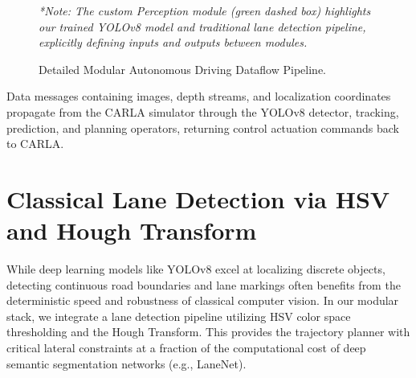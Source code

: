 \documentclass[11pt,a4paper]{report}
\begin{document}
\begin{figure}[htbp]
{
    }
    \vspace{1ex}
    
    {\small \textit{*Note: The custom Perception module (green dashed box) highlights our trained YOLOv8 model and traditional lane detection pipeline, explicitly defining inputs and outputs between modules.}}
    \caption{Detailed Modular Autonomous Driving Dataflow Pipeline.}
    \label{fig:pylot_diagram}
\end{figure}

Data messages containing images, depth streams, and localization coordinates propagate from the CARLA simulator through the YOLOv8 detector, tracking, prediction, and planning operators, returning control actuation commands back to CARLA.

\section{Classical Lane Detection via HSV and Hough Transform}
\label{sec:hough_transform}

While deep learning models like YOLOv8 excel at localizing discrete objects, detecting continuous road boundaries and lane markings often benefits from the deterministic speed and robustness of classical computer vision. In our modular stack, we integrate a lane detection pipeline utilizing HSV color space thresholding and the Hough Transform. This provides the trajectory planner with critical lateral constraints at a fraction of the computational cost of deep semantic segmentation networks (e.g., LaneNet).
\end{document}
